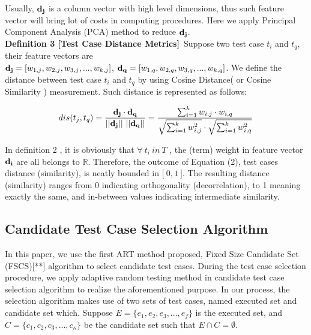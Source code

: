 \documentclass{sig-alternate}
\begin{document}
Usually, ${\bf  d_{j}}$ is a column vector with high level dimensions, thus such feature vector will bring lot of costs in computing procedures. Here we apply Principal Component Analysis (PCA) method to reduce ${\bf  d_{j}}$.\\

{\bf Definition 3 [Test Case Distance Metrics]}~Suppose two test case $t_{i}$ and $t_{q}$, their feature vectors are\\ ${\bf d_{j}} = [w_{1,j}, w_{2,j}, w_{3,j},...,w_{k,j}]$, ${\bf d_{q}} = [w_{1,q}, w_{2,q}, w_{3,q},...,w_{k,q}]$. We define the distance between test case $t_{i}$ and $t_{q}$ by using Cosine Distance( or Cosine Similarity ) measurement. Such distance is represented as follows:

\begin{equation}dis(t_{j}, t_{q}) = \frac{  {\bf d_{j}} \cdot {\bf d_{q} } }{ || {\bf d_{j} } || ~||  {\bf d_{q}} || } = \frac{ \sum_{i=1}^{k} w_{i,j}\cdot w_{i,q} }{\sqrt{  \sum_{i=1}^{k} w_{i,j}^{2} } \cdot \sqrt{ \sum_{i=1}^{k} w_{i,q}^{2}  }  }\end{equation}

In definition 2 , it is obviously that $\forall ~t_{i}~ in ~T$ , the (term) weight in feature vector $\bf d_{i}$ are all belongs to $\mathbb{R}$. Therefore, the outcome of Equation (2), test cases distance (similarity), is neatly bounded in $\lbrack ~0, 1 ~\rbrack$. The resulting distance (similarity) ranges from 0 indicating orthogonality (decorrelation), to 1 meaning exactly the same, and in-between values indicating intermediate similarity.




\subsection{Candidate Test Case Selection Algorithm}
In this paper,  we use the first ART method proposed, Fixed Size Candidate Set (FSCS)[**] algorithm to select candidate test cases. During the test case selection procedure, we apply adaptive random testing method in candidate test case selection algorithm to realize the aforementioned purpose. In our process, the selection algorithm makes use of two sets of test cases, named executed set and candidate set which. Suppose $E = \{e_{1}, e_{2}, e_{3}, ..., e_{f}\}$ is the executed set, and $C= \{c_{1}, c_{2}, c_{3}, ..., c_{\kappa}\}$ be the candidate set such that $E \cap C = \emptyset$.  
\end{document}
